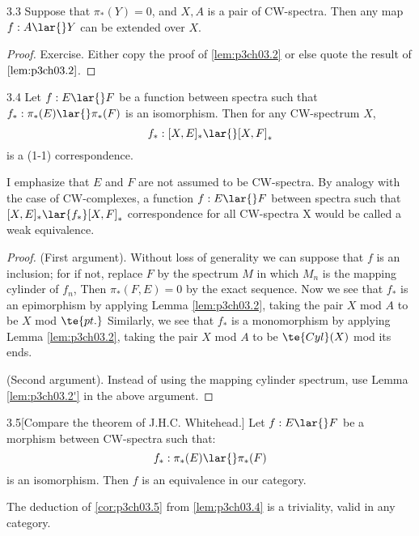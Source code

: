 \documentclass[../main]{subfiles}
\begin{document}
\begin{customlemma}{3.3} \label{lem:p3ch03.3}
Suppose that $\pi_\ast(Y)=0$, and $X,A$ is a pair of CW-spectra. Then any map $f:A\lar{}Y$ can be extended over $X$.
\end{customlemma}
\begin{proof}
Exercise. Either copy the proof of \ref{lem:p3ch03.2} or else quote the result of $\ref{lem:p3ch03.2}$.
\end{proof}

\begin{customthm}{3.4}\label{lem:p3ch03.4}
Let $f:E\lar{}F$ be a function between spectra such that $f_\ast:\pi_\ast(E)\lar{} \pi_\ast(F)$ is an isomorphism. Then for any CW-spectrum $X$, \[f_\ast:[X,E]_\ast \lar{}[X,F]_\ast\] is a (1-1) correspondence.
\end{customthm}
I emphasize that $E$ and $F$ are not assumed to be CW-spectra.
By analogy with the case of CW-complexes, a function $f: E\lar{} F$
between spectra such that $ [X,E]_\ast \lar{f_\ast}[X,F]_\ast$ correspondence
for all CW-spectra X would be called a weak equivalence. 

\begin{proof}
(First argument). Without loss of generality we
can suppose that $f$ is an inclusion; for if not, replace $F$ by the
spectrum $M$ in which $M_n$ is the mapping cylinder of $f_n$, Then
$\pi_\ast(F,E) = 0$ by the exact sequence. Now we see that $f_\ast$ is an epimorphism by applying Lemma \ref{lem:p3ch03.2}, taking the pair $X$ mod $A$ to be $X$ mod $\te{pt.}$
Similarly, we see that $f_\ast$ is a monomorphism by applying Lemma \ref{lem:p3ch03.2}, taking the pair $X$ mod $A$ to be $\te{Cyl}(X)$ mod its ends.

(Second argument). Instead of using the mapping cylinder spectrum,
use Lemma \ref{lem:p3ch03.2'} in the above argument. 
\end{proof}

\begin{customcor}{3.5}[Compare the theorem of J.H.C. Whitehead.] \label{cor:p3ch03.5} Let $f:E\lar{}F$ be a morphism between CW-spectra such that:
\[f_\ast:\pi_\ast(E)\lar{} \pi_\ast(F)\]
is an isomorphism. Then $f$ is an equivalence in our category. 
\end{customcor}
The deduction of \ref{cor:p3ch03.5} from \ref{lem:p3ch03.4} is a triviality, valid in any category. 
\end{document}
